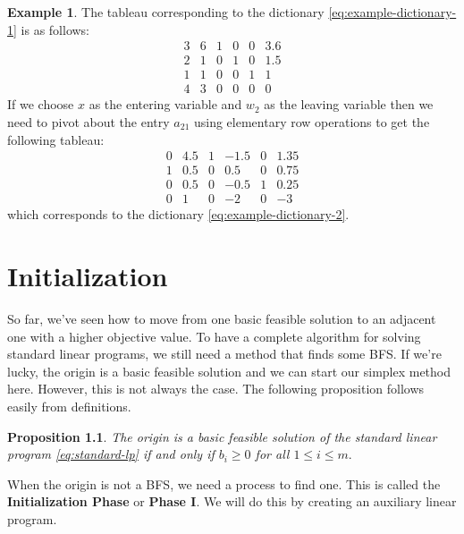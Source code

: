 \documentclass[
]{book}
\newtheorem{proposition}{Proposition}[chapter]
\theoremstyle{definition}
\theoremstyle{definition}
\newtheorem{example}{Example}[chapter]
\theoremstyle{definition}
\theoremstyle{definition}
\theoremstyle{remark}
\begin{document}
\begin{example}
The tableau corresponding to the dictionary \eqref{eq:example-dictionary-1} is as follows:
\begin{equation*}
  \begin{array}{lllll|l}
    3 & 6 & 1 & 0 & 0 & 3.6 \\
    \boxed{2} & 1 & 0 & 1 & 0 & 1.5 \\
    1  & 1 & 0 & 0 & 1 & 1 \\ \hline 
    4 & 3 & 0 & 0 & 0 & 0
  \end{array}
\end{equation*}
If we choose \(x\) as the entering variable and \(w_2\) as the leaving variable then we need to pivot about the entry \(a_{21}\) using elementary row operations to get the following tableau:
\begin{equation*}
  \begin{array}{lllll|l}
    0 & 4.5 & 1 & -1.5 & 0 & 1.35 \\
    \boxed{1} & 0.5 & 0 & 0.5 & 0 & 0.75 \\
    0  & 0.5 & 0 & -0.5 & 1 & 0.25 \\ \hline
    0 & 1 & 0 & -2 & 0 & -3
  \end{array}
\end{equation*}
which corresponds to the dictionary \eqref{eq:example-dictionary-2}.
\end{example}

\hypertarget{initialization}{%
\chapter{Initialization}\label{initialization}}

So far, we've seen how to move from one basic feasible solution to an adjacent one with a higher objective value.
To have a complete algorithm for solving standard linear programs, we still need a method that finds some BFS.
If we're lucky, the origin is a basic feasible solution and we can start our simplex method here.
However, this is not always the case. The following proposition follows easily from definitions.

\begin{proposition}
The origin is a basic feasible solution of the standard linear program \eqref{eq:standard-lp} if and only if \(b_i \ge 0\) for all \(1 \le i \le m.\)
\end{proposition}

When the origin is not a BFS, we need a process to find one.
This is called the \textbf{Initialization Phase} or \textbf{Phase I}.
We will do this by creating an auxiliary linear program.
\end{document}
